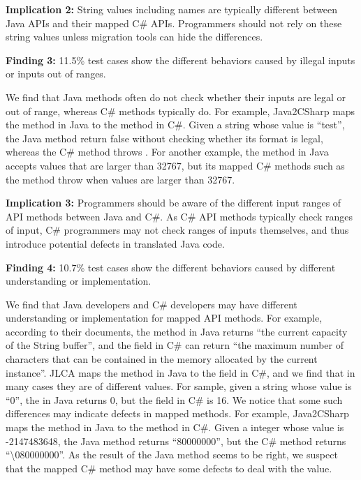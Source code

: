 \textbf{Implication 2:} String values including names are typically different between Java APIs and their mapped C\# APIs. Programmers should not rely on these string values unless migration tools can hide the differences.

\textbf{Finding 3:} 11.5\% test cases show the different behaviors caused by illegal inputs or inputs out of ranges.

We find that Java methods often do not check whether their inputs are legal or out of range, whereas C\# methods typically do. For example, Java2CSharp maps the  method in Java to the  method in C\#. Given a string whose value is ``test'', the Java method return false without checking whether its format is legal, whereas the C\# method throws . For another example, the  method in Java accepts values that are larger than 32767, but its mapped C\# methods such as the  method throw  when values are larger than 32767.

\textbf{Implication 3:} Programmers should be aware of the different input ranges of API methods between Java and C\#. As C\# API methods typically check ranges of input, C\# programmers may not check ranges of inputs themselves, and thus introduce potential defects in translated Java code.

\textbf{Finding 4:} 10.7\% test cases show the different behaviors caused by different understanding or implementation.

We find that Java developers and C\# developers may have different understanding or implementation for mapped API methods. For example, according to their documents, the  method in Java returns ``the current capacity of the String buffer'', and the  field in C\# can return ``the maximum number of characters that can be contained in the memory allocated by the current instance''. JLCA maps the method in Java to the field in C\#, and we find that in many cases they are of different values. For sample, given a string whose value is ``0'', the  in Java returns 0, but the  field in C\# is 16. We notice that some such differences may indicate defects in mapped methods. For example, Java2CSharp maps the  method in Java to the  method in C\#. Given a integer whose value is -2147483648, the Java method returns ``80000000'', but the C\# method returns ``\textbackslash080000000''. As the result of the Java method seems to be right, we suspect that the mapped C\# method may have some defects to deal with the value.

